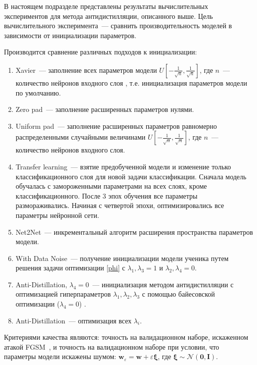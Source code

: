 В настоящем подразделе представлены результаты вычислительных экспериментов для метода антидистилляции, описанного выше. Цель вычислительного эксперимента~--- сравнить производительность моделей в зависимости от инициализации параметров.

Производится сравнение различных подходов к инициализации:
\begin{enumerate}
    \item Xavier~--- заполнение всех параметров модели $U[-\frac1{\sqrt{n}}, \frac1{\sqrt{n}}]$, где $n$~--- количество нейронов входного слоя \cite{glorot2010understanding}, т.е. инициализация параметров модели по умолчанию.
    \item Zero pad~--- заполнение расширенных параметров нулями.
    \item Uniform pad~--- заполнение расширенных параметров равномерно распределенными случайными величинами $U[-\frac1{\sqrt{n}}, \frac1{\sqrt{n}}]$, где $n$~--- количество нейронов входного слоя.
    \item Transfer learning~--- взятие предобученной модели и изменение только классификационного слоя для новой задачи классификации. Сначала модель обучалась с замороженными параметрами на всех слоях, кроме классификационного. После 3 эпох обучения все параметры размораживались. Начиная с четвертой эпохи, оптимизировались все параметры нейронной сети.
    \item Net2Net~--- инкрементальный алгоритм расширения пространства параметров модели\cite{net2net}.
    \item With Data Noise~--- получение инициализации модели ученика путем решения задачи оптимизации \ref{phi} с $\lambda_1, \lambda_3 = 1$ и $\lambda_2, \lambda_4 = 0$.
    \item Anti-Distillation, $\lambda_4 = 0$~--- инициализация методом антидистилляции с оптимизацией гиперпараметров $\lambda_1, \lambda_2, \lambda_3$ с помощью байесовской оптимизации ($\lambda_4 = 0$) \cite{akiba2019optuna}.
    \item Anti-Distillation~--- оптимизация всех $\lambda_i$.
\end{enumerate}

Критериями качества являются: точность на валидационном наборе, искаженном атакой FGSM~\cite{goodfellow2014explaining}, и точность на валидационном наборе при условии, что параметры модели искажены шумом: ${\mathbf{w}_\varepsilon} = \mathbf{w} + \varepsilon \boldsymbol{\xi}$, где $\boldsymbol{\xi} \sim \mathcal{N} (\mathbf{0}, \mathbf{I})$.

